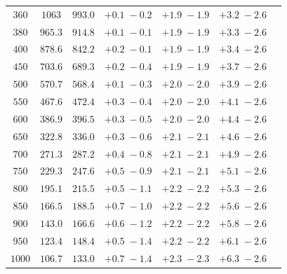 \begin{table}
\begin{tabular}{ccccccc}
 $ 360$ & $  1063 $ & $  993.0$ & $ +0.1 \; -\!0.2$ & $ +1.9 \; -\!1.9$ & $ +3.2 \; -\!2.6$ \\
 $ 380$ & $  965.3$ & $  914.8$ & $ +0.1 \; -\!0.1$ & $ +1.9 \; -\!1.9$ & $ +3.3 \; -\!2.6$ \\
 $ 400$ & $  878.6$ & $  842.2$ & $ +0.2 \; -\!0.1$ & $ +1.9 \; -\!1.9$ & $ +3.4 \; -\!2.6$ \\
 $ 450$ & $  703.6$ & $  689.3$ & $ +0.2 \; -\!0.4$ & $ +1.9 \; -\!1.9$ & $ +3.7 \; -\!2.6$ \\
 $ 500$ & $  570.7$ & $  568.4$ & $ +0.1 \; -\!0.3$ & $ +2.0 \; -\!2.0$ & $ +3.9 \; -\!2.6$ \\
 $ 550$ & $  467.6$ & $  472.4$ & $ +0.3 \; -\!0.4$ & $ +2.0 \; -\!2.0$ & $ +4.1 \; -\!2.6$ \\
 $ 600$ & $  386.9$ & $  396.5$ & $ +0.3 \; -\!0.5$ & $ +2.0 \; -\!2.0$ & $ +4.4 \; -\!2.6$ \\
 $ 650$ & $  322.8$ & $  336.0$ & $ +0.3 \; -\!0.6$ & $ +2.1 \; -\!2.1$ & $ +4.6 \; -\!2.6$ \\
 $ 700$ & $  271.3$ & $  287.2$ & $ +0.4 \; -\!0.8$ & $ +2.1 \; -\!2.1$ & $ +4.9 \; -\!2.6$ \\
 $ 750$ & $  229.3$ & $  247.6$ & $ +0.5 \; -\!0.9$ & $ +2.1 \; -\!2.1$ & $ +5.1 \; -\!2.6$ \\
 $ 800$ & $  195.1$ & $  215.5$ & $ +0.5 \; -\!1.1$ & $ +2.2 \; -\!2.2$ & $ +5.3 \; -\!2.6$ \\
 $ 850$ & $  166.5$ & $  188.5$ & $ +0.7 \; -\!1.0$ & $ +2.2 \; -\!2.2$ & $ +5.6 \; -\!2.6$ \\
 $ 900$ & $  143.0$ & $  166.6$ & $ +0.6 \; -\!1.2$ & $ +2.2 \; -\!2.2$ & $ +5.8 \; -\!2.6$ \\
 $ 950$ & $  123.4$ & $  148.4$ & $ +0.5 \; -\!1.4$ & $ +2.2 \; -\!2.2$ & $ +6.1 \; -\!2.6$ \\
 $1000$ & $  106.7$ & $  133.0$ & $ +0.7 \; -\!1.4$ & $ +2.3 \; -\!2.3$ & $ +6.3 \; -\!2.6$ \\
\hline
\end{tabular}
\label{tab:NNLO14TeV}
\end{table}


